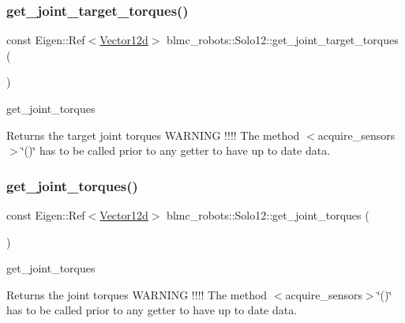 \subsubsection{\texorpdfstring{get\+\_\+joint\+\_\+target\+\_\+torques()}{get\_joint\_target\_torques()}}
{\footnotesize\ttfamily const Eigen\+::\+Ref$<$\hyperlink{common__header_8hpp_a80313eb420184518596e745eecf4b494}{Vector12d}$>$ blmc\+\_\+robots\+::\+Solo12\+::get\+\_\+joint\+\_\+target\+\_\+torques (\begin{DoxyParamCaption}{ }\end{DoxyParamCaption})\hspace{0.3cm}{\ttfamily [inline]}}



get\+\_\+joint\+\_\+torques 

\begin{DoxyReturn}{Returns}
the target joint torques W\+A\+R\+N\+I\+NG !!!! The method $<$acquire\+\_\+sensors$>$\char`\"{}()\char`\"{} has to be called prior to any getter to have up to date data. 
\end{DoxyReturn}
\mbox{\label{classblmc__robots_1_1Solo12_acfc399c1070c44d4ae98a1d806dca783}} 
\subsubsection{\texorpdfstring{get\+\_\+joint\+\_\+torques()}{get\_joint\_torques()}}
{\footnotesize\ttfamily const Eigen\+::\+Ref$<$\hyperlink{common__header_8hpp_a80313eb420184518596e745eecf4b494}{Vector12d}$>$ blmc\+\_\+robots\+::\+Solo12\+::get\+\_\+joint\+\_\+torques (\begin{DoxyParamCaption}{ }\end{DoxyParamCaption})\hspace{0.3cm}{\ttfamily [inline]}}



get\+\_\+joint\+\_\+torques 

\begin{DoxyReturn}{Returns}
the joint torques W\+A\+R\+N\+I\+NG !!!! The method $<$acquire\+\_\+sensors$>$\char`\"{}()\char`\"{} has to be called prior to any getter to have up to date data. 
\end{DoxyReturn}
\mbox{\label{classblmc__robots_1_1Solo12_aa0a6eb846038b644b425c1efd4c8a81f}} 
